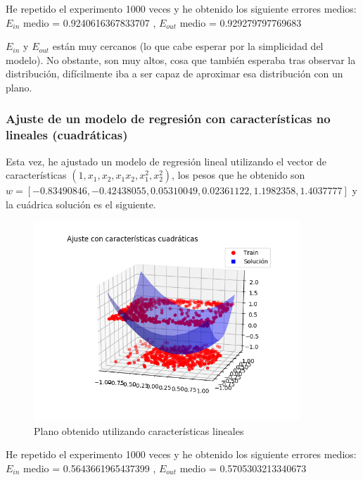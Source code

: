\documentclass[a4]{article}
\begin{document}
\vspace{-5mm}

He repetido el experimento 1000 veces y he obtenido los siguiente 
errores medios: \\
$E_{in}$ medio =  0.9240616367833707 ,\qquad
$E_{out}$ medio =  0.929279797769683

$E_{in}$ y $E_{out}$ están muy cercanos (lo que cabe esperar por la simplicidad del modelo).
No obstante, son muy altos, cosa que también esperaba tras observar la 
distribución, difícilmente iba a ser capaz de aproximar esa distribución con un plano.

\subsubsection{Ajuste de un modelo de regresión con características no lineales (cuadráticas)}

Esta vez, he ajustado un modelo de regresión lineal utilizando el vector de características
$(1,x_1,x_2,x_1 x_2,x_1^2,x_2^2)$, los pesos que he obtenido son
$w = [-0.83490846,-0.42438055,0.05310049,0.02361122,1.1982358,1.4037777]$
y la cuádrica solución es el siguiente. \vspace{-4mm}

\begin{figure}[H]
    \centering    
    \includegraphics[width=100mm]{imgs/regress-nolin.png}
    \caption{Plano obtenido utilizando características lineales}
    \label{fig:regress-nolin}
\end{figure}

\vspace{-5mm}

He repetido el experimento 1000 veces y he obtenido los siguiente 
errores medios: \\
$E_{in}$ medio =  0.5643661965437399 , \qquad
$E_{out}$ medio =  0.5705303213340673
\end{document}

